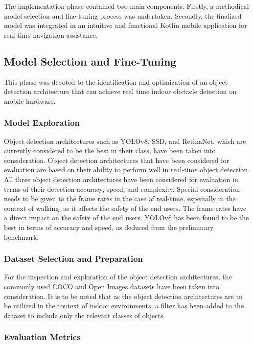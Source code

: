 \documentclass{FastFyp}
\begin{document}
The implementation phase contained two main components. Firstly, a methodical model selection and fine-tuning process was undertaken. Secondly, the finalized model was integrated in an intuitive and functional Kotlin mobile application for real time navigation assistance.

\subsection{Model Selection and Fine-Tuning}

This phase was devoted to the identification and optimization of an object detection architecture that can achieve real time indoor obstacle detection on mobile hardware.


\subsubsection{Model Exploration}

Object detection architectures such as YOLOv8, SSD, and RetinaNet, which are currently considered to be the best in their class, have been taken into consideration. Object detection architectures that have been considered for evaluation are based on their ability to perform well in real-time object detection. All three object detection architectures have been considered for evaluation in terms of their detection accuracy, speed, and complexity. Special consideration needs to be given to the frame rates in the case of real-time, especially in the context of walking, as it affects the safety of the end users. The frame rates have a direct impact on the safety of the end users. YOLOv8 has been found to be the best in terms of accuracy and speed, as deduced from the preliminary benchmark.

\subsubsection{Dataset Selection and Preparation}

For the inspection and exploration of the object detection architectures, the commonly used COCO and Open Images datasets have been taken into consideration. It is to be noted that as the object detection architectures are to be utilized in the context of indoor environments, a filter has been added to the dataset to include only the relevant classes of objects.

\subsubsection{Evaluation Metrics}
\end{document}
